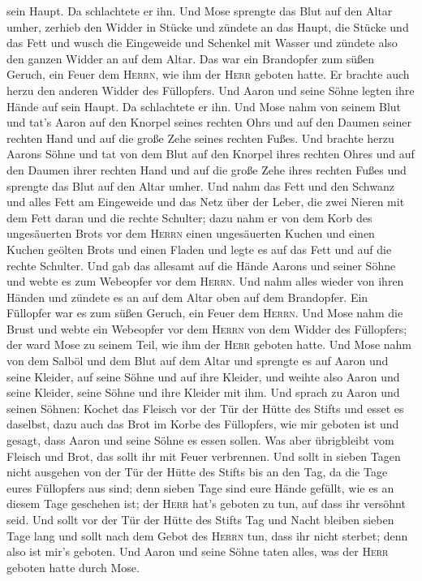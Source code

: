 sein Haupt.  Da schlachtete er ihn. Und Mose sprengte das
Blut auf den Altar umher,  zerhieb den Widder in Stücke
und zündete an das Haupt, die Stücke und das Fett  und
wusch die Eingeweide und Schenkel mit Wasser und zündete also den ganzen
Widder an auf dem Altar. Das war ein Brandopfer zum süßen Geruch, ein
Feuer dem \textsc{Herrn}, wie ihm der \textsc{Herr} geboten hatte.
 Er brachte auch herzu den anderen Widder des Füllopfers.
Und Aaron und seine Söhne legten ihre Hände auf sein Haupt.
 Da schlachtete er ihn. Und Mose nahm von seinem Blut und
tat's Aaron auf den Knorpel seines rechten Ohrs und auf den Daumen
seiner rechten Hand und auf die große Zehe seines rechten Fußes.
 Und brachte herzu Aarons Söhne und tat von dem Blut auf
den Knorpel ihres rechten Ohres und auf den Daumen ihrer rechten Hand
und auf die große Zehe ihres rechten Fußes und sprengte das Blut auf den
Altar umher.  Und nahm das Fett und den Schwanz und alles
Fett am Eingeweide und das Netz über der Leber, die zwei Nieren mit dem
Fett daran und die rechte Schulter;  dazu nahm er von dem
Korb des ungesäuerten Brots vor dem \textsc{Herrn} einen ungesäuerten
Kuchen und einen Kuchen geölten Brots und einen Fladen und legte es auf
das Fett und auf die rechte Schulter.  Und gab das
allesamt auf die Hände Aarons und seiner Söhne und webte es zum
Webeopfer vor dem \textsc{Herrn}.  Und nahm alles wieder
von ihren Händen und zündete es an auf dem Altar oben auf dem
Brandopfer. Ein Füllopfer war es zum süßen Geruch, ein Feuer dem
\textsc{Herrn}.  Und Mose nahm die Brust und webte ein
Webeopfer vor dem \textsc{Herrn} von dem Widder des Füllopfers; der ward
Mose zu seinem Teil, wie ihm der \textsc{Herr} geboten hatte.
 Und Mose nahm von dem Salböl und dem Blut auf dem Altar
und sprengte es auf Aaron und seine Kleider, auf seine Söhne und auf
ihre Kleider, und weihte also Aaron und seine Kleider, seine Söhne und
ihre Kleider mit ihm.  Und sprach zu Aaron und seinen
Söhnen: Kochet das Fleisch vor der Tür der Hütte des Stifts und esset es
daselbst, dazu auch das Brot im Korbe des Füllopfers, wie mir geboten
ist und gesagt, dass Aaron und seine Söhne es essen sollen.
 Was aber übrigbleibt vom Fleisch und Brot, das sollt ihr
mit Feuer verbrennen.  Und sollt in sieben Tagen nicht
ausgehen von der Tür der Hütte des Stifts bis an den Tag, da die Tage
eures Füllopfers aus sind; denn sieben Tage sind eure Hände gefüllt,
 wie es an diesem Tage geschehen ist; der \textsc{Herr}
hat's geboten zu tun, auf dass ihr versöhnt seid.  Und
sollt vor der Tür der Hütte des Stifts Tag und Nacht bleiben sieben Tage
lang und sollt nach dem Gebot des \textsc{Herrn} tun, dass ihr nicht
sterbet; denn also ist mir's geboten.  Und Aaron und
seine Söhne taten alles, was der \textsc{Herr} geboten hatte durch Mose.

